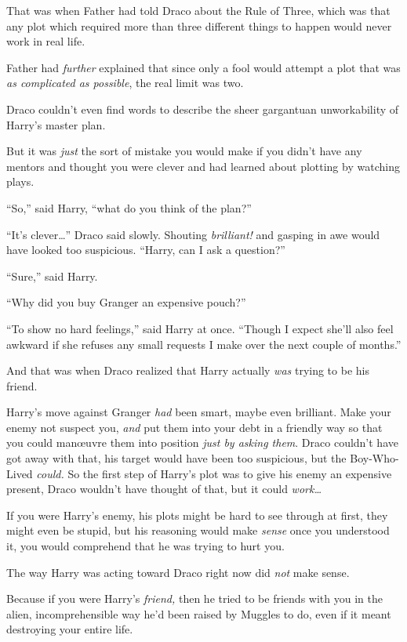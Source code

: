 That was when Father had told Draco about the Rule of Three, which was that any plot which required more than three different things to happen would never work in real life.

Father had \emph{further} explained that since only a fool would attempt a plot that was \emph{as complicated as possible}, the real limit was two.

Draco couldn’t even find words to describe the sheer gargantuan unworkability of Harry’s master plan.

But it was \emph{just} the sort of mistake you would make if you didn’t have any mentors and thought you were clever and had learned about plotting by watching plays.

“So,” said Harry, “what do you think of the plan?”

“It’s clever…” Draco said slowly. Shouting \emph{brilliant!} and gasping in awe would have looked too suspicious. “Harry, can I ask a question?”

“Sure,” said Harry.

“Why did you buy Granger an expensive pouch?”

“To show no hard feelings,” said Harry at once. “Though I expect she’ll also feel awkward if she refuses any small requests I make over the next couple of months.”

And that was when Draco realized that Harry actually \emph{was} trying to be his friend.

Harry’s move against Granger \emph{had} been smart, maybe even brilliant. Make your enemy not suspect you, \emph{and} put them into your debt in a friendly way so that you could manœuvre them into position \emph{just by asking them}. Draco couldn’t have got away with that, his target would have been too suspicious, but the Boy-Who-Lived \emph{could.} So the first step of Harry’s plot was to give his enemy an expensive present, Draco wouldn’t have thought of that, but it could \emph{work…}

If you were Harry’s enemy, his plots might be hard to see through at first, they might even be stupid, but his reasoning would make \emph{sense} once you understood it, you would comprehend that he was trying to hurt you.

The way Harry was acting toward Draco right now did \emph{not} make sense.

Because if you were Harry’s \emph{friend,} then he tried to be friends with you in the alien, incomprehensible way he’d been raised by Muggles to do, even if it meant destroying your entire life.

